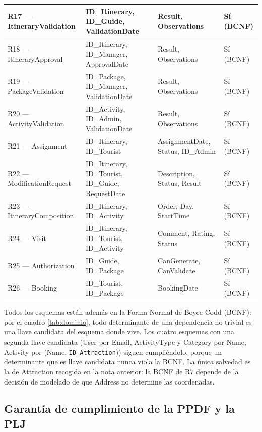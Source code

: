 \documentclass[11pt,a4paper]{article}
\begin{document}
{\begin{longtable}{|>{\raggedright\arraybackslash}p{3.88cm}|>{\raggedright\arraybackslash}p{3.98cm}|>{\raggedright\arraybackslash}p{5.78cm}|>{\raggedright\arraybackslash}p{1.68cm}|}
R17 — ItineraryValidation & ID\_Itinerary, ID\_Guide, ValidationDate & Result, Observations & Sí (BCNF) \\ \hline
R18 — ItineraryApproval & ID\_Itinerary, ID\_Manager, ApprovalDate & Result, Observations & Sí (BCNF) \\ \hline
R19 — PackageValidation & ID\_Package, ID\_Manager, ValidationDate & Result, Observations & Sí (BCNF) \\ \hline
R20 — ActivityValidation & ID\_Activity, ID\_Admin, ValidationDate & Result, Observations & Sí (BCNF) \\ \hline
R21 — Assignment & ID\_Itinerary, ID\_Tourist & AssignmentDate, Status, ID\_Admin & Sí (BCNF) \\ \hline
R22 — ModificationRequest & ID\_Itinerary, ID\_Tourist, ID\_Guide, RequestDate & Description, Status, Result & Sí (BCNF) \\ \hline
R23 — ItineraryComposition & ID\_Itinerary, ID\_Activity & Order, Day, StartTime & Sí (BCNF) \\ \hline
R24 — Visit & ID\_Itinerary, ID\_Tourist, ID\_Activity & Comment, Rating, Status & Sí (BCNF) \\ \hline
R25 — Authorization & ID\_Guide, ID\_Package & CanGenerate, CanValidate & Sí (BCNF) \\ \hline
R26 — Booking & ID\_Tourist, ID\_Package & BookingDate & Sí (BCNF) \\ \hline
\end{longtable}}
\vspace{2pt}
Todos los esquemas están además en la Forma Normal de Boyce-Codd (BCNF): por el cuadro \ref{tab:dominio}, todo determinante de una dependencia no trivial es una llave candidata del esquema donde vive. Los cuatro esquemas con una segunda llave candidata (User por Email, ActivityType y Category por Name, Activity por (Name, \texttt{ID\_Attraction})) siguen cumpliéndolo, porque un determinante que es llave candidata nunca viola la BCNF. La única salvedad es la de Attraction recogida en la nota anterior: la BCNF de R7 depende de la decisión de modelado de que Address no determine las coordenadas.

\subsection{Garantía de cumplimiento de la PPDF y la PLJ}
\end{document}
